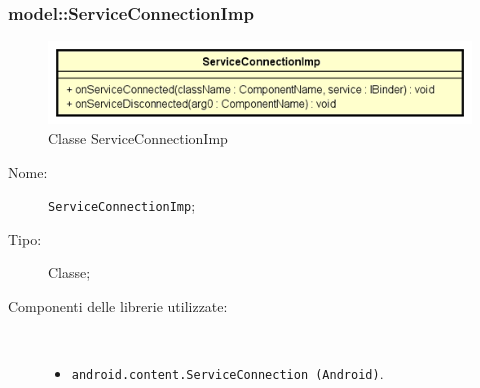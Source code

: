\documentclass[../DefinizioneDiProdotto.tex]{subfiles}
\begin{document}
\subsubsection{model::ServiceConnectionImp}

    \begin{figure}[H]
        \centering
        \includegraphics{img/ServiceConnectionImp.png}
        \caption{Classe ServiceConnectionImp}\label{fig:model::ServiceConnectionImp} 
    \end{figure}
    \begin{description}
\item[Nome:] \texttt{ServiceConnectionImp};
\item[Tipo:] Classe;
\item[Componenti delle librerie utilizzate:] \
\begin{itemize}
\item \texttt{android.content.ServiceConnection (Android)}.


\end{itemize}
\end{description}
\end{document}
